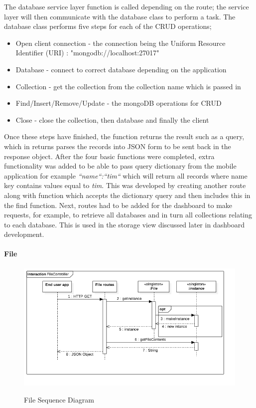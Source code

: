 The database service layer function is called depending on the route; the service layer will then communicate with the database class to perform a task. The database class performs five steps for each of the CRUD operations;

\begin{itemize}
  \item Open client connection
  - the connection being the Uniform Resource Identifier (URI) : "mongodb://localhost:27017" 
  \item Database 
  - connect to correct database depending on the application
  \item Collection
  - get the collection from the collection name which is passed in
  \item Find/Insert/Remove/Update
  - the mongoDB operations for CRUD
  \item Close
  - close the collection, then database and finally the client
\end{itemize}

Once these steps have finished, the function returns the result such as a query, which in returns parses the records into JSON form to be sent back in the response object. After the four basic functions were completed, extra functionality was added to be able to pass query dictionary from the mobile application for example \textit{{``name``:``tim``}} which will return all records where name key contains values equal to \textit{tim}. This was developed by creating another route along with function which accepts the dictionary query and then includes this in the find function. Next, routes had to be added for the dashboard to make requests, for example, to retrieve all databases and in turn all collections relating to each database. This is used in the storage view discussed later in dashboard development. 

\paragraph{File}

\begin{figure}[!h]
    \caption{File Sequence Diagram}
    \centering
    \includegraphics[width=150mm]{images/sequence/FileController}
    \label{fig:file-seq}
\end{figure}

